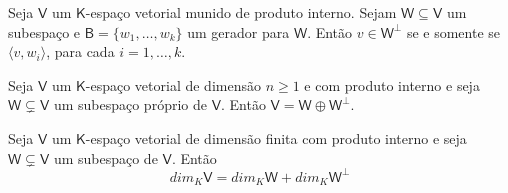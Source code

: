 \documentclass[10pt,a4paper]{article}
\begin{document}
\begin{proposition} 
	Seja $\mathsf{V}$ um $\mathsf{K}$-espaço vetorial munido de produto interno. Sejam $\mathsf{W} \subseteq \mathsf{V}$ um subespaço e $\mathsf{B} = \{ w_1,\dots, w_k \}$ um gerador para $\mathsf{W}$. Então $v \in \mathsf{W} ^ \perp$ se e somente se $\langle v, w_i \rangle$, para cada $i = 1, \dots, k$.
\end{proposition}

\begin{proposition} 
	Seja $\mathsf{V}$ um $\mathsf{K}$-espaço vetorial de dimensão $n \geq 1$ e com produto interno e seja $\mathsf{W} \subsetneq \mathsf{V}$ um subespaço próprio de $\mathsf{V}$. Então $\mathsf{V} = \mathsf{W} \oplus \mathsf{W} ^ \perp$.
\end{proposition}

\begin{corollary} 
	Seja $\mathsf{V}$ um $\mathsf{K}$-espaço vetorial de dimensão finita com produto interno e seja $\mathsf{W} \subsetneq \mathsf{V}$ um subespaço de $\mathsf{V}$. Então 
	\[
		dim_K \mathsf{V} = dim_K \mathsf{W} + dim_K \mathsf{W} ^ \perp
	\]
\end{corollary}
\end{document}
